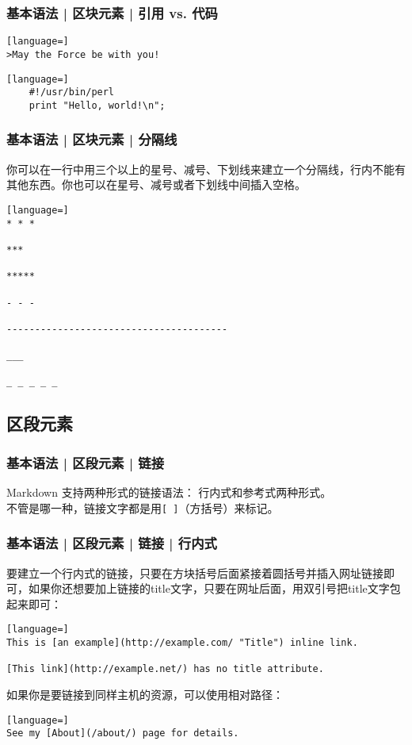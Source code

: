 \begin{frame}[fragile]
  \frametitle{基本语法 | 区块元素 | 引用 vs. 代码}
\begin{lstlisting}[language=]
>May the Force be with you!
\end{lstlisting}
  \pause
\begin{lstlisting}[language=]
    #!/usr/bin/perl
    print "Hello, world!\n";
\end{lstlisting}
\end{frame}

\begin{frame}[fragile]
  \frametitle{基本语法 | 区块元素 | \alert{分隔线}}
    你可以在一行中用三个以上的星号、减号、下划线来建立一个分隔线，行内不能有其他东西。你也可以在星号、减号或者下划线中间插入空格。
\begin{lstlisting}[language=]
* * *

***

*****

- - -

---------------------------------------

___

_ _ _ _ _
\end{lstlisting}
\end{frame}

\subsection{区段元素}
\begin{frame}[fragile]
  \frametitle{基本语法 | 区段元素 | 链接}
  Markdown 支持两种形式的链接语法： 行内式和参考式两种形式。\\
  \vspace{1em}
  不管是哪一种，链接文字都是用\verb|[ ]|（方括号）来标记。
\end{frame}

\begin{frame}[fragile]
  \frametitle{基本语法 | 区段元素 | 链接 | \alert{行内式}}
  要建立一个行内式的链接，只要在方块括号后面紧接着圆括号并插入网址链接即可，如果你还想要加上链接的title文字，只要在网址后面，用双引号把title文字包起来即可：
\begin{lstlisting}[language=]
This is [an example](http://example.com/ "Title") inline link.

[This link](http://example.net/) has no title attribute.
\end{lstlisting}
\pause
如果你是要链接到同样主机的资源，可以使用相对路径：
\begin{lstlisting}[language=]
See my [About](/about/) page for details.
\end{lstlisting}
\end{frame}

